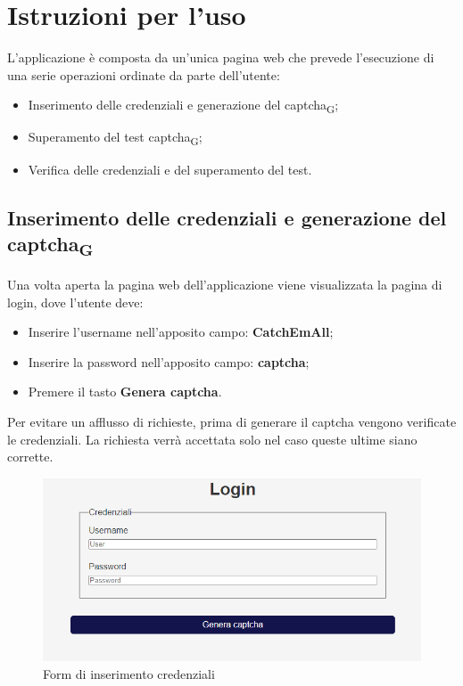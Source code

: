 \section{Istruzioni per l'uso}
L'applicazione è composta da un'unica pagina web che prevede l'esecuzione di una serie operazioni ordinate da parte dell'utente:
\begin{itemize}
	\item Inserimento delle credenziali e generazione del captcha\textsubscript{G};
	\item Superamento del test captcha\textsubscript{G};
    \item Verifica delle credenziali e del superamento del test.
\end{itemize}    

\subsection{Inserimento delle credenziali e generazione del captcha\textsubscript{G}}
Una volta aperta la pagina web dell'applicazione viene visualizzata la pagina di login, dove l'utente deve:
\begin{itemize}
	\item Inserire l'username nell'apposito campo: \textbf{CatchEmAll};
	\item Inserire la password nell'apposito campo: \textbf{captcha};
    \item Premere il tasto \textbf{Genera captcha}.
\end{itemize}    
Per evitare un afflusso di richieste, prima di generare il captcha vengono verificate le credenziali. La richiesta verrà accettata solo nel caso queste ultime siano corrette.

\begin{figure}[H]
    \centering
    \includegraphics[scale=0.8]{img/login.png}
    \caption{Form di inserimento credenziali}
\end{figure}

